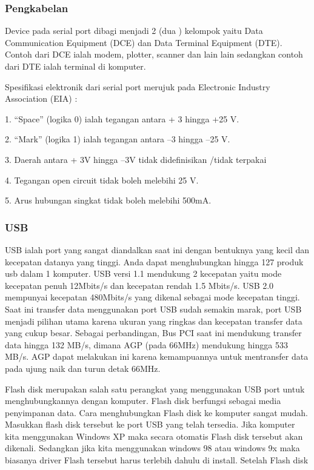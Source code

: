 \subsubsection{Pengkabelan}
Device pada serial port dibagi menjadi 2 (dua ) kelompok yaitu Data Communication Equipment (DCE) dan Data Terminal Equipment (DTE). Contoh dari DCE ialah modem, plotter, scanner dan lain lain sedangkan contoh dari DTE ialah terminal di komputer.

Spesifikasi elektronik dari serial port merujuk pada Electronic Industry Association (EIA) :

1. “Space” (logika 0) ialah tegangan antara + 3 hingga +25 V.

2. “Mark” (logika 1) ialah tegangan antara –3 hingga –25 V.

3. Daerah antara + 3V hingga –3V tidak didefinisikan /tidak terpakai

4. Tegangan open circuit tidak boleh melebihi 25 V.

5. Arus hubungan singkat tidak boleh melebihi 500mA.

\subsubsection{USB}
USB ialah port yang sangat diandalkan saat ini dengan bentuknya yang kecil dan kecepatan datanya yang tinggi. Anda dapat menghubungkan hingga 127 produk usb dalam 1 komputer. USB versi 1.1 mendukung 2 kecepatan yaitu mode kecepatan penuh 12Mbits/s dan kecepatan rendah 1.5 Mbits/s. USB 2.0 mempunyai kecepatan 480Mbits/s yang dikenal sebagai mode kecepatan tinggi. 
Saat ini transfer data menggunakan port USB sudah semakin marak, port USB menjadi pilihan utama karena ukuran yang ringkas dan kecepatan transfer data yang cukup besar.  Sebagai perbandingan, Bus  PCI saat ini mendukung transfer data hingga 132 MB/s, dimana AGP (pada 66MHz) mendukung hingga 533 MB/s. AGP  dapat melakukan ini karena kemampuannya untuk mentransfer data pada ujung naik dan turun detak 66MHz. 

Flash disk merupakan salah satu perangkat yang menggunakan USB port untuk menghubungkannya dengan komputer. Flash disk berfungsi sebagai media penyimpanan data. Cara menghubungkan Flash disk ke komputer sangat mudah. Masukkan flash disk tersebut ke port USB yang telah tersedia. Jika komputer kita menggunakan Windows XP maka secara otomatis Flash disk tersebut akan dikenali. Sedangkan jika kita menggunakan windows 98 atau windows 9x maka biasanya driver Flash tersebut harus terlebih dahulu di install. Setelah Flash disk

